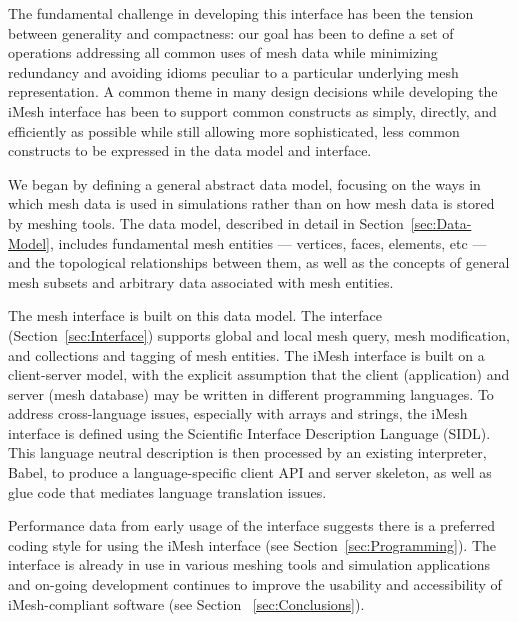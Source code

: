 The fundamental challenge in developing this interface has been the
tension between generality and compactness: our goal has been to define
a set of operations addressing all common uses of mesh data while
minimizing redundancy and avoiding idioms peculiar to a particular
underlying mesh representation.  A common theme in many design decisions
while developing the iMesh interface has been to support common
constructs as simply, directly, and efficiently as possible while still
allowing more sophisticated, less common constructs to be expressed in
the data model and interface.

We began by defining a general abstract data model, focusing on the ways
in which mesh data is used in simulations rather than on how mesh data
is stored by meshing tools.  The data model, described in detail in
Section~\ref{sec:Data-Model}, includes fundamental mesh entities ---
vertices, faces, elements, etc --- and the topological relationships
between them, as well as the concepts of general mesh subsets and
arbitrary data associated with mesh entities.

The mesh interface is built on this data model.  The interface
(Section~\ref{sec:Interface}) supports global and local mesh query, mesh
modification, and collections and tagging of mesh entities.  
The iMesh interface is built on a client-server model, with the
explicit assumption that the client (application) and server (mesh
database) may be written in different programming languages.  To address
cross-language issues, especially with arrays and strings, the iMesh
interface is defined using the Scientific Interface Description Language
(SIDL)\cite{babel:site05,babel:usersguide05}.  This language neutral
description is then processed by an existing interpreter, Babel, to
produce a language-specific client API and server skeleton, as well as
glue code that mediates language translation issues.

Performance data from early usage of the interface suggests there is a
preferred coding style for using the iMesh interface (see
Section~\ref{sec:Programming}).  The interface is already in use in
various meshing tools and simulation applications and on-going
development continues to improve the usability and accessibility of
iMesh-compliant software (see Section ~\ref{sec:Conclusions}).


